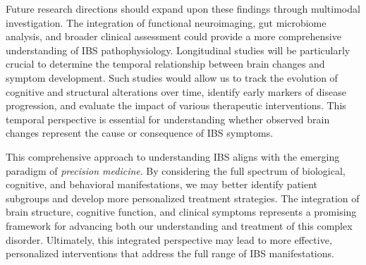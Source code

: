 \documentclass[diagnostics,article,accept,pdftex,moreauthors]{Definitions/mdpi}
\begin{document}
Future research directions should expand upon these findings through multimodal investigation. The integration of functional neuroimaging, gut microbiome analysis, and broader clinical assessment \cite{li2024irritable} could provide a more comprehensive understanding of IBS pathophysiology. Longitudinal studies will be particularly crucial to determine the temporal relationship between brain changes and symptom development. Such studies would allow us to track the evolution of cognitive and structural alterations over time, identify early markers of disease progression, and evaluate the impact of various therapeutic interventions. This temporal perspective is essential for understanding whether observed brain changes represent the cause or consequence of IBS symptoms.

This comprehensive approach to understanding IBS aligns with the emerging paradigm of \textit{precision medicine}. By considering the full spectrum of biological, cognitive, and behavioral manifestations, we may better identify patient subgroups and develop more personalized treatment strategies. The integration of brain structure, cognitive function, and clinical symptoms represents a promising framework for advancing both our understanding and treatment of this complex disorder. Ultimately, this integrated perspective may lead to more effective, personalized interventions that address the full range of IBS manifestations. 
\end{document}

